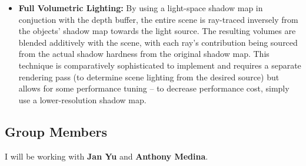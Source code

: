 \documentclass[12pt]{article}
\begin{document}
\begin{itemize}
	\item \textbf{Full Volumetric Lighting:} By using a light-space shadow map in conjuction with the depth buffer, the entire scene is ray-traced inversely from the objects' shadow map towards the light source. The resulting volumes are blended additively with the scene, with each ray's contribution being sourced from the actual shadow hardness from the original shadow map. This technique is comparatively sophisticated to implement and requires a separate rendering pass (to determine scene lighting from the desired source) but allows for some performance tuning -- to decrease performance cost, simply use a lower-resolution shadow map.
\end{itemize}

\subsection*{Group Members}
I will be working with \textbf{Jan Yu} and \textbf{Anthony Medina}.
\end{document}
